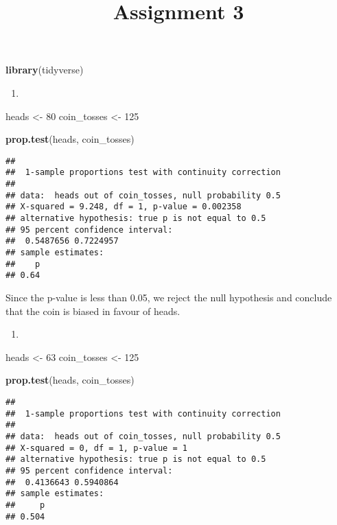 \documentclass[
]{article}
\title{Assignment 3}
\author{}
\date{\vspace{-2.5em}}
\newenvironment{Shaded}{\begin{snugshade}}{\end{snugshade}}
\newcommand{\DecValTok}[1]{\textcolor[rgb]{0.00,0.00,0.81}{#1}}
\newcommand{\KeywordTok}[1]{\textcolor[rgb]{0.13,0.29,0.53}{\textbf{#1}}}
\newcommand{\NormalTok}[1]{#1}
\newcommand{\StringTok}[1]{\textcolor[rgb]{0.31,0.60,0.02}{#1}}
\begin{document}
\maketitle

\begin{Shaded}
\begin{Highlighting}[]
\KeywordTok{library}\NormalTok{(tidyverse)}
\end{Highlighting}
\end{Shaded}

\begin{enumerate}
\def\labelenumi{\alph{enumi})}
\item
\end{enumerate}

\begin{Shaded}
\begin{Highlighting}[]
\NormalTok{heads <-}\StringTok{ }\DecValTok{80}
\NormalTok{coin_tosses <-}\StringTok{ }\DecValTok{125}

\KeywordTok{prop.test}\NormalTok{(heads, coin_tosses)}
\end{Highlighting}
\end{Shaded}

\begin{verbatim}
## 
##  1-sample proportions test with continuity correction
## 
## data:  heads out of coin_tosses, null probability 0.5
## X-squared = 9.248, df = 1, p-value = 0.002358
## alternative hypothesis: true p is not equal to 0.5
## 95 percent confidence interval:
##  0.5487656 0.7224957
## sample estimates:
##    p 
## 0.64
\end{verbatim}

Since the p-value is less than 0.05, we reject the null hypothesis and
conclude that the coin is biased in favour of heads.

\begin{enumerate}
\def\labelenumi{\alph{enumi})}
\setcounter{enumi}{1}
\item
\end{enumerate}

\begin{Shaded}
\begin{Highlighting}[]
\NormalTok{heads <-}\StringTok{ }\DecValTok{63}
\NormalTok{coin_tosses <-}\StringTok{ }\DecValTok{125}

\KeywordTok{prop.test}\NormalTok{(heads, coin_tosses)}
\end{Highlighting}
\end{Shaded}

\begin{verbatim}
## 
##  1-sample proportions test with continuity correction
## 
## data:  heads out of coin_tosses, null probability 0.5
## X-squared = 0, df = 1, p-value = 1
## alternative hypothesis: true p is not equal to 0.5
## 95 percent confidence interval:
##  0.4136643 0.5940864
## sample estimates:
##     p 
## 0.504
\end{verbatim}
\end{document}
